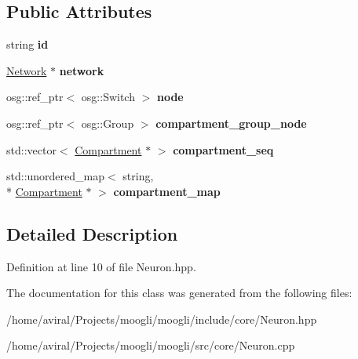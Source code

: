 \subsection*{Public Attributes}
\begin{DoxyCompactItemize}
\item 
\hypertarget{classNeuron_a1c503e02c29f6b5c8a1840a6e0a847e3}{string {\bfseries id}}\label{classNeuron_a1c503e02c29f6b5c8a1840a6e0a847e3}

\item 
\hypertarget{classNeuron_af4bdb3f8cf8632347adb3eeec89537e1}{\hyperlink{classNetwork}{Network} $\ast$ {\bfseries network}}\label{classNeuron_af4bdb3f8cf8632347adb3eeec89537e1}

\item 
\hypertarget{classNeuron_a56ba863d9204d9e962889cbcb1ff2181}{osg\-::ref\-\_\-ptr$<$ osg\-::\-Switch $>$ {\bfseries node}}\label{classNeuron_a56ba863d9204d9e962889cbcb1ff2181}

\item 
\hypertarget{classNeuron_a0af3d6fb2d7f69e85ee9d6ac50bd31bc}{osg\-::ref\-\_\-ptr$<$ osg\-::\-Group $>$ {\bfseries compartment\-\_\-group\-\_\-node}}\label{classNeuron_a0af3d6fb2d7f69e85ee9d6ac50bd31bc}

\item 
\hypertarget{classNeuron_a6d30e48d2a4d43a65d0f904e12db7d1f}{std\-::vector$<$ \hyperlink{classCompartment}{Compartment} $\ast$ $>$ {\bfseries compartment\-\_\-seq}}\label{classNeuron_a6d30e48d2a4d43a65d0f904e12db7d1f}

\item 
\hypertarget{classNeuron_a30d03e58657a0383b3298ca220ae5d4a}{std\-::unordered\-\_\-map$<$ string, \\*
\hyperlink{classCompartment}{Compartment} $\ast$ $>$ {\bfseries compartment\-\_\-map}}\label{classNeuron_a30d03e58657a0383b3298ca220ae5d4a}

\end{DoxyCompactItemize}


\subsection{Detailed Description}


Definition at line 10 of file Neuron.\-hpp.



The documentation for this class was generated from the following files\-:\begin{DoxyCompactItemize}
\item 
/home/aviral/\-Projects/moogli/moogli/include/core/Neuron.\-hpp\item 
/home/aviral/\-Projects/moogli/moogli/src/core/Neuron.\-cpp\end{DoxyCompactItemize}
